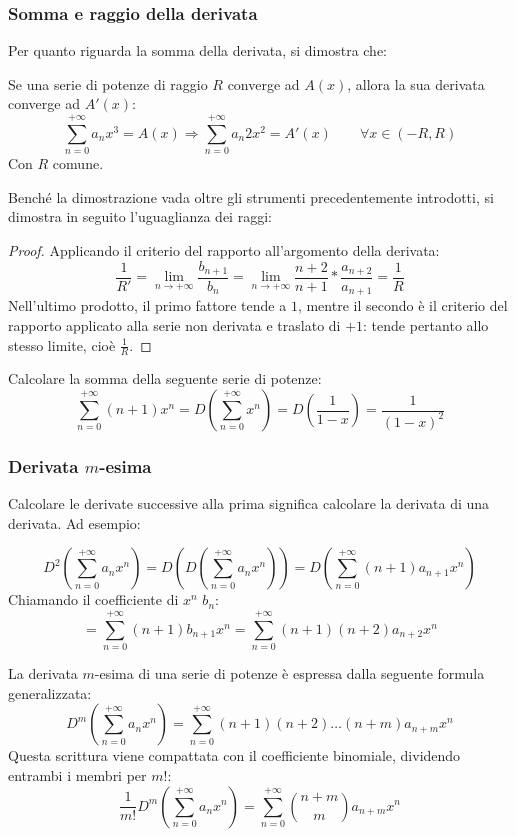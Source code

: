 \subsubsection{Somma e raggio della derivata}
Per quanto riguarda la somma della derivata, si dimostra che:
\begin{teor}
	Se una serie di potenze di raggio $R$ converge ad $A(x)$, allora la sua derivata converge ad $A'(x)$:
	\[
		\sum_{n=0}^{+\infty} a_n x^3=A(x)\Rightarrow\sum_{n=0}^{+\infty} a_n 2x^2=A'(x)\qquad\forall x\in(-R,R)
	\]
	Con $R$ comune.
\end{teor}
Benché la dimostrazione vada oltre gli strumenti precedentemente introdotti, si dimostra in seguito l'uguaglianza dei raggi:
\begin{proof}
	Applicando il criterio del rapporto all'argomento della derivata:
	\[
		\frac{1}{R'}=\lim_{n\to+\infty}\frac{b_{n+1}}{b_n}=\lim_{n\to+\infty}\frac{n+2}{n+1}*\frac{a_{n+2}}{a_{n+1}}=\frac{1}{R}
	\]
	Nell'ultimo prodotto, il primo fattore tende a $1$, mentre il secondo è il criterio del rapporto applicato alla serie non derivata e traslato di $+1$: tende pertanto allo stesso limite, cioè $\frac{1}{R}$.
\end{proof}

\begin{examp}
	\label{ex:dergeom}
	Calcolare la somma della seguente serie di potenze:
	\[
		\sum_{n=0}^{+\infty}(n+1)x^n=D\left(\sum_{n=0}^{+\infty}x^n\right)=D\left(\frac{1}{1-x}\right)=\frac{1}{(1-x)^2}
	\]
\end{examp}

\subsubsection{Derivata $m$-esima}
Calcolare le derivate successive alla prima significa calcolare la derivata di una derivata. Ad esempio:
\begin{examp}
	\[
		D^2\left(\sum_{n=0}^{+\infty}a_nx^n\right)=D\left(D\left(\sum_{n=0}^{+\infty}a_nx^n\right)\right)=D\left(\sum_{n=0}^{+\infty}(n+1)a_{n+1}x^n\right)
	\]
	Chiamando il coefficiente di $x^n$ $b_n$:
	\[
		=\sum_{n=0}^{+\infty}(n+1)b_{n+1}x^n=\sum_{n=0}^{+\infty}(n+1)(n+2)a_{n+2}x^n
	\]
\end{examp}

La derivata $m$-esima di una serie di potenze è espressa dalla seguente formula generalizzata:
\begin{equation}
	D^m\left(\sum_{n=0}^{+\infty}a_nx^n\right)=\sum_{n=0}^{+\infty}(n+1)(n+2)\dots(n+m)a_{n+m}x^n
\end{equation}
Questa scrittura viene compattata con il coefficiente binomiale, dividendo entrambi i membri per $m!$:
\[
	\frac{1}{m!}D^m\left(\sum_{n=0}^{+\infty}a_nx^n\right)=\sum_{n=0}^{+\infty}\binom{n+m}{m}a_{n+m}x^n
\]

